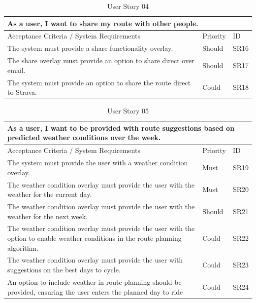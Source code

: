 \begin{table}[!htb]
\caption{User Story 04}
\label{tab:user-story-04}
\begin{tabular}{ p{8cm} p{1cm}  p{1cm} }
\hline
\multicolumn{3}{p{13cm}}{As a user, I want to share my route with other people.}\\ 
\hline
Acceptance Criteria / System Requirements & Priority & ID\\
\hline
The system must provide a share functionality overlay. & Should & SR16 \\
The share overlay must provide an option to share direct over email. & Should & SR17\\
The system must provide an option to share the route direct to Strava. & Could & SR18\\ 
\hline
\end{tabular}
\end{table}

\begin{table}[!htb]
\caption{User Story 05}
\label{tab:user-story-05}
\begin{tabular}{ p{8cm} p{1cm}  p{1cm} }
\hline
\multicolumn{3}{p{13cm}}{As a user, I want to be provided with route suggestions based on predicted weather conditions over the week.}\\ 
\hline
Acceptance Criteria / System Requirements & Priority & ID\\
\hline
The system must provide the user with a weather condition overlay. & Must & SR19 \\
The weather condition overlay must provide the user with the weather for the current day. & Must & SR20\\
The weather condition overlay must provide the user with the weather for the next week. & Should & SR21\\
The weather condition overlay must provide the user with the option to enable weather conditions in the route planning algorithm. & Could & SR22\\ 
The weather condition overlay must provide the user with suggestions on the best days to cycle. & Could & SR23\\
An option to include weather in route planning should be provided, ensuring the user enters the planned day to ride & Could & SR24\\ 
\hline
\end{tabular}
\end{table}


